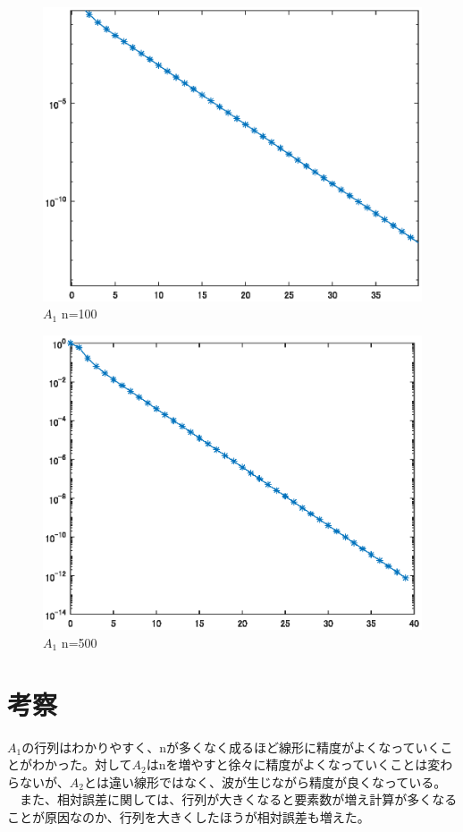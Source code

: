 \documentclass[titlepage, a4paper, 11pt, dvipdfmx]{jsarticle}
\begin{document}
  \begin{figure}[H]
    \begin{center}%
      \includegraphics[width=13.5cm]{./graphics/CG/100rema.eps}
    \caption{$A_1$ n=100}
    \label{Label}%
    \end{center}
  \end{figure}


  \begin{figure}[H]
    \begin{center}%
      \includegraphics[width=13.5cm]{./graphics/CG/500rema.eps}
    \caption{$A_1$ n=500}
    \label{Label}%
    \end{center}
  \end{figure}

\section{考察}
$A_1$の行列はわかりやすく、nが多くなく成るほど線形に精度がよくなっていくことがわかった。対して$A_2$はnを増やすと徐々に精度がよくなっていくことは変わらないが、$A_2$とは違い線形ではなく、波が生じながら精度が良くなっている。
　また、相対誤差に関しては、行列が大きくなると要素数が増え計算が多くなることが原因なのか、行列を大きくしたほうが相対誤差も増えた。
\end{document}
